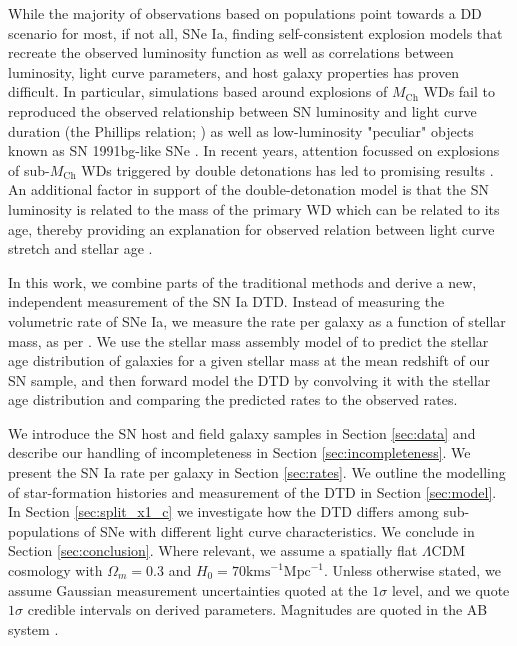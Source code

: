 \documentclass[fleqn,usenatbib]{mnras}
\begin{document}
While the majority of observations based on populations point towards a DD scenario for most, if not all, SNe Ia, finding self-consistent explosion models that recreate the observed luminosity function as well as correlations between luminosity, light curve parameters, and host galaxy properties has proven difficult. In particular, simulations based around explosions of $M_{\mathrm{Ch}}$ WDs fail to reproduced the observed relationship between SN luminosity and light curve duration (the Phillips relation; \citealt{Phillips1993}) as well as low-luminosity "peculiar" objects known as SN 1991bg-like SNe \citep{Sim2013,Blondin2017}. In recent years, attention focussed on explosions of sub-$M_{\mathrm{Ch}}$ WDs triggered by double detonations has led to promising results \citep[e.g.][]{Chen2017,Chen2018,Townsley2019,Gronow2020}. An additional factor in support of the double-detonation model is that the SN luminosity is related to the mass of the primary WD which can be related to its age, thereby providing an explanation for observed relation between light curve stretch and stellar age \citep{Rigault2013,Rigault2018,Nicolas2020}.

In this work, we combine parts of the traditional methods and derive a new, independent measurement of the SN Ia DTD. Instead of measuring the volumetric rate of SNe Ia, we measure the rate per galaxy as a function of stellar mass, as per \citet{Sullivan2006,Smith2012}. We use the stellar mass assembly model of \citet{Childress2014} to predict the stellar age distribution of galaxies for a given stellar mass at the mean redshift of our SN sample, and then forward model the DTD by convolving it with the stellar age distribution and comparing the predicted rates to the observed rates.

We introduce the SN host and field galaxy samples in Section \ref{sec:data} and describe our handling of incompleteness in Section \ref{sec:incompleteness}. We present the SN Ia rate per galaxy in Section \ref{sec:rates}. We outline the modelling of star-formation histories and measurement of the DTD in Section \ref{sec:model}. In Section \ref{sec:split_x1_c} we investigate how the DTD differs among sub-populations of SNe with different light curve characteristics. We conclude in Section \ref{sec:conclusion}.
Where relevant, we assume a spatially flat $\Lambda$CDM cosmology with $\Omega_m = 0.3$ and $H_0 = 70 \mathrm{ km s}^{-1}\mathrm{Mpc}^{-1}$. Unless otherwise stated, we assume Gaussian measurement uncertainties quoted at the $1\sigma$ level, and we quote $1\sigma$ credible intervals on derived parameters. Magnitudes are quoted in the AB system \citep{Oke1983}.
\end{document}
